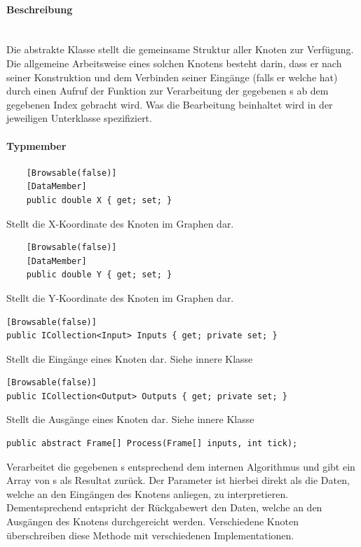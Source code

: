 \paragraph{Beschreibung}~\\
Die abstrakte Klasse  stellt die gemeinsame Struktur aller Knoten zur Verfügung. Die allgemeine Arbeitsweise eines solchen Knotens besteht darin, dass er nach seiner Konstruktion und dem Verbinden seiner Eingänge (falls er welche hat) durch einen Aufruf der Funktion  zur Verarbeitung der gegebenen s ab dem gegebenen Index gebracht wird. Was die Bearbeitung beinhaltet wird in der jeweiligen Unterklasse spezifiziert.

\paragraph{Typmember}
\begin{itemize}

	\begin{verbatim}
	[Browsable(false)]
	[DataMember]
	public double X { get; set; }
	\end{verbatim}
	Stellt die X-Koordinate des Knoten im Graphen dar.

	\begin{verbatim}
	[Browsable(false)]
	[DataMember]
	public double Y { get; set; }
	\end{verbatim}
	Stellt die Y-Koordinate des Knoten im Graphen dar.

	\begin{verbatim}
[Browsable(false)]
public ICollection<Input> Inputs { get; private set; }
	\end{verbatim}
Stellt die Eingänge eines Knoten dar. Siehe innere Klasse 

	\begin{verbatim}
[Browsable(false)]
public ICollection<Output> Outputs { get; private set; }
	\end{verbatim}
Stellt die Ausgänge eines Knoten dar. Siehe innere Klasse 

	\begin{verbatim}
public abstract Frame[] Process(Frame[] inputs, int tick);
	\end{verbatim}
	Verarbeitet die gegebenen s entsprechend dem internen Algorithmus und gibt ein Array von s als Resultat zurück. Der Parameter  ist hierbei direkt als die Daten, welche an den Eingängen des Knotens anliegen, zu interpretieren. Dementsprechend entspricht der Rückgabewert den Daten, welche an den Ausgängen des Knotens durchgereicht werden. Verschiedene Knoten überschreiben diese Methode mit verschiedenen Implementationen.


\end{itemize}

